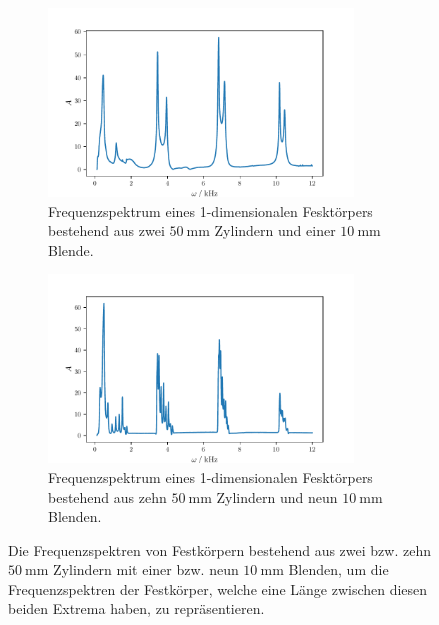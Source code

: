 \begin{figure}
    \begin{subfigure}{0.48\textwidth}%
    \centering%
    \includegraphics[height=5cm]{build/2c1b10.pdf}%
    \caption{Frequenzspektrum eines 1-dimensionalen Fesktörpers bestehend aus zwei $\qty{50}{\milli\meter}$ Zylindern und einer $\qty{10}{\milli\meter}$ Blende.}%
    \label{fig:2c1b10}%
    \end{subfigure}%
    \hfill%
    \begin{subfigure}{0.48\textwidth}%
    \centering%
    \includegraphics[height=5cm]{build/10c9b10.pdf}%
    \caption{Frequenzspektrum eines 1-dimensionalen Fesktörpers bestehend aus zehn $\qty{50}{\milli\meter}$ Zylindern und neun $\qty{10}{\milli\meter}$ Blenden.}%
    \label{fig:2c1b}%
    \end{subfigure}%
    \caption{Die Frequenzspektren von Festkörpern bestehend aus zwei bzw. zehn $\qty{50}{\milli\meter}$ Zylindern mit einer bzw. neun $\qty{10}{\milli\meter}$ Blenden, um die 
    Frequenzspektren der Festkörper, welche eine Länge zwischen diesen beiden Extrema haben, zu repräsentieren.}%
    \label{fig:10mm}
\end{figure}%
